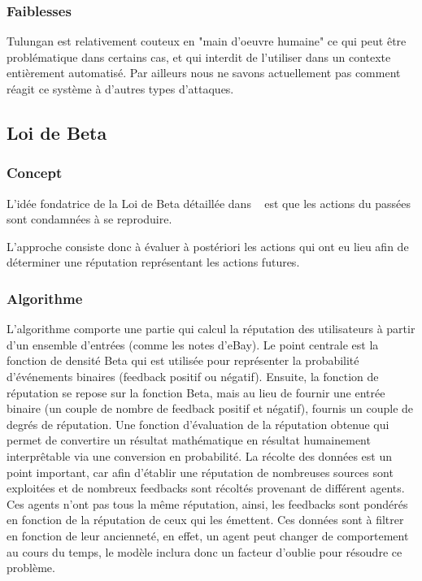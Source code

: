 \documentclass[a4paper, 11pt]{article} %
\begin{document}
\subsubsection{Faiblesses}
Tulungan est relativement couteux en "main d'oeuvre humaine" ce qui peut être problématique dans certains cas, et qui interdit de l'utiliser dans un contexte entièrement automatisé.
Par ailleurs nous ne savons actuellement pas comment réagit ce système à d'autres types d'attaques.

\subsection{Loi de Beta}
\subsubsection{Concept}
L'idée fondatrice de la Loi de Beta détaillée dans ~\cite{Commerce02thebeta} 
est que les actions du passées sont condamnées à se reproduire.

L'approche consiste donc à évaluer à postériori les actions qui ont eu lieu
afin de déterminer une réputation représentant les actions futures.

\subsubsection{Algorithme}
L'algorithme comporte une partie qui calcul la réputation des utilisateurs à partir d'un ensemble d'entrées (comme les notes d'eBay).
Le point centrale est la fonction de densité Beta qui est utilisée pour représenter la probabilité d'événements binaires (feedback positif ou négatif).
Ensuite, la fonction de réputation se repose sur la fonction Beta, mais au lieu de fournir une entrée binaire (un couple de nombre de feedback positif et négatif), fournis un couple de degrés de réputation.
Une fonction d'évaluation de la réputation obtenue qui permet de convertire un résultat mathématique en résultat humainement interprêtable via une conversion en probabilité.
La récolte des données est un point important, car afin d'établir une réputation de nombreuses sources sont exploitées et de nombreux feedbacks sont récoltés provenant de différent agents. Ces agents n'ont pas tous la même réputation, ainsi, les feedbacks sont pondérés en fonction de la réputation de ceux qui les émettent.
Ces données sont à filtrer en fonction de leur ancienneté, en effet, un agent peut changer de comportement au cours du temps, le modèle inclura donc un facteur d'oublie pour résoudre ce problème.
\end{document}

